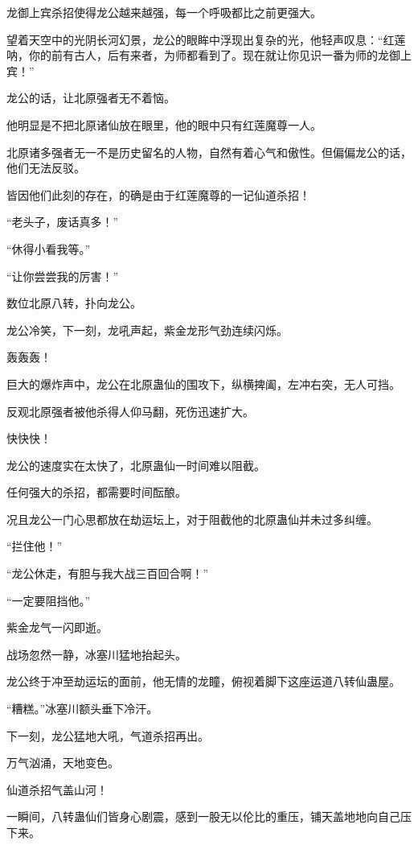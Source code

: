 
\begin{this_body}

龙御上宾杀招使得龙公越来越强，每一个呼吸都比之前更强大。

望着天空中的光阴长河幻景，龙公的眼眸中浮现出复杂的光，他轻声叹息：“红莲呐，你的前有古人，后有来者，为师都看到了。现在就让你见识一番为师的龙御上宾！”

龙公的话，让北原强者无不着恼。

他明显是不把北原诸仙放在眼里，他的眼中只有红莲魔尊一人。

北原诸多强者无一不是历史留名的人物，自然有着心气和傲性。但偏偏龙公的话，他们无法反驳。

皆因他们此刻的存在，的确是由于红莲魔尊的一记仙道杀招！

“老头子，废话真多！”

“休得小看我等。”

“让你尝尝我的厉害！”

数位北原八转，扑向龙公。

龙公冷笑，下一刻，龙吼声起，紫金龙形气劲连续闪烁。

轰轰轰！

巨大的爆炸声中，龙公在北原蛊仙的围攻下，纵横捭阖，左冲右突，无人可挡。

反观北原强者被他杀得人仰马翻，死伤迅速扩大。

快快快！

龙公的速度实在太快了，北原蛊仙一时间难以阻截。

任何强大的杀招，都需要时间酝酿。

况且龙公一门心思都放在劫运坛上，对于阻截他的北原蛊仙并未过多纠缠。

“拦住他！”

“龙公休走，有胆与我大战三百回合啊！”

“一定要阻挡他。”

紫金龙气一闪即逝。

战场忽然一静，冰塞川猛地抬起头。

龙公终于冲至劫运坛的面前，他无情的龙瞳，俯视着脚下这座运道八转仙蛊屋。

“糟糕。”冰塞川额头垂下冷汗。

下一刻，龙公猛地大吼，气道杀招再出。

万气汹涌，天地变色。

仙道杀招气盖山河！

一瞬间，八转蛊仙们皆身心剧震，感到一股无以伦比的重压，铺天盖地地向自己压下来。


\end{this_body}
